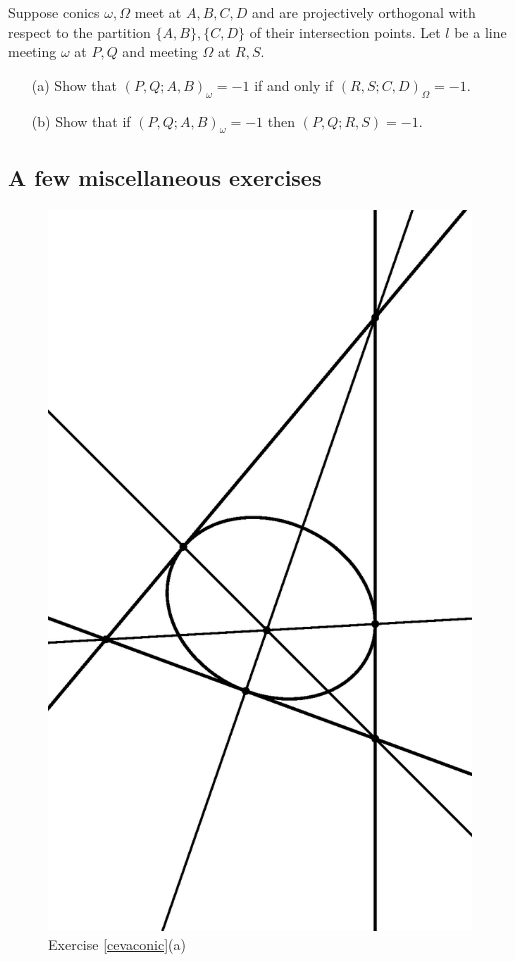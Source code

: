 \begin{exer} Suppose conics $\omega,\Omega$ meet at $A,B,C,D$ and are projectively orthogonal with respect to the partition $\{A,B\},\{C,D\}$ of their intersection points. Let $l$ be a line meeting $\omega$ at $P,Q$ and meeting $\Omega$ at $R,S$.
\begin{itemize}
\item[(a)] Show that $(P,Q;A,B)_\omega = -1$ if and only if $(R,S;C,D)_{\Omega} = -1$.

\item[(b)] Show that if $(P,Q;A,B)_\omega = -1$ then $(P,Q;R,S) = -1$.
\end{itemize}
\end{exer}

\subsection{A few miscellaneous exercises}

\begin{figure}[!htb]
\centering
\includegraphics[scale=0.3,angle=270]{cevaconic.eps}
\caption{Exercise \ref{cevaconic}(a)}
\end{figure}

